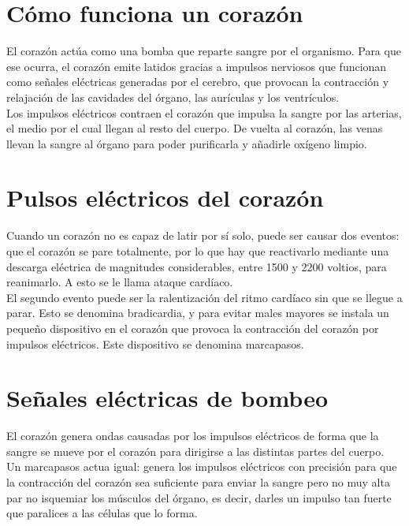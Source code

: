 \documentclass[11pt,a4paper]{article}
\begin{document}
\newpage

\section{Cómo funciona un corazón}

El corazón actúa como  una bomba que reparte sangre por el organismo. Para que ese ocurra, el corazón emite latidos gracias a impulsos nerviosos que funcionan como señales eléctricas generadas por el cerebro, que provocan la contracción y relajación de las cavidades del órgano, las aurículas y los ventrículos.\\

Los impulsos eléctricos contraen el corazón que impulsa la sangre por las arterias, el medio por el cual llegan al resto del cuerpo. De vuelta al corazón, las venas llevan la sangre al órgano para poder purificarla y añadirle oxígeno limpio.

\section{Pulsos eléctricos del corazón}

Cuando un corazón no es capaz de latir por sí solo, puede ser causar dos eventos: que el corazón se pare totalmente, por lo que hay que reactivarlo mediante una descarga eléctrica de magnitudes considerables, entre 1500 y 2200 voltios, para reanimarlo. A esto se le llama ataque cardíaco.\\

El segundo evento puede ser la ralentización del ritmo cardíaco sin que se llegue a parar. Esto se denomina bradicardia, y para evitar males mayores se instala un pequeño dispositivo en el corazón que provoca la contracción del corazón por impulsos eléctricos. Este dispositivo se denomina marcapasos.

\section{Señales eléctricas de bombeo}

El corazón genera ondas causadas por los impulsos eléctricos de forma que la sangre se mueve por el corazón para dirigirse a las distintas partes del cuerpo.\\

Un marcapasos actua igual: genera los impulsos eléctricos con precisión para que la contracción del corazón sea suficiente para enviar la sangre pero no muy alta par no isquemiar los músculos del órgano, es decir, darles un impulso tan fuerte que paralices a las células que lo forma.\\
\end{document}
